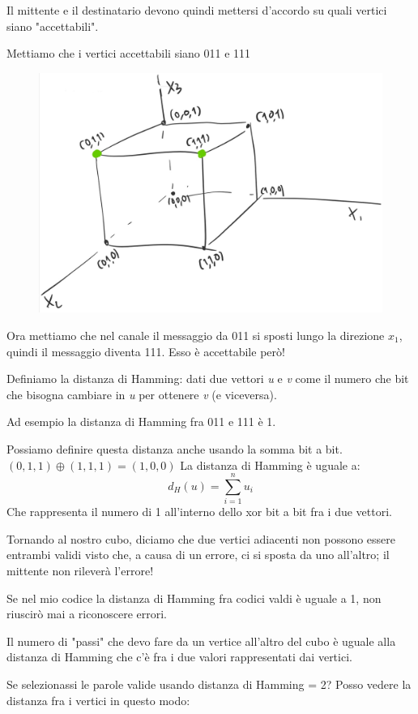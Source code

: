 Il mittente e il destinatario devono quindi mettersi d'accordo su quali vertici siano "accettabili".

Mettiamo che i vertici accettabili siano 011 e 111

\begin{figure}[H]
	\centering
	\includegraphics[width=0.7\linewidth]{immagini/img8}
\end{figure}


Ora mettiamo che nel canale il messaggio da 011 si sposti lungo la direzione $x_1$, quindi il messaggio diventa 111. Esso è accettabile però!

Definiamo la distanza di Hamming: dati due vettori \textit{u} e \textit{v} come il numero che bit che bisogna cambiare in \textit{u} per ottenere \textit{v} (e viceversa).

Ad esempio la distanza di Hamming fra 011 e 111 è 1.

Possiamo definire questa distanza anche usando la somma bit a bit.
$(0,1,1) \oplus (1,1,1) = (1,0,0)$
La distanza di Hamming è uguale a:
\begin{equation}
d_H(u)=\sum_{i=1}^{n}u_i
\end{equation}
Che rappresenta il numero di 1 all'interno dello xor bit a bit fra i due vettori.

Tornando al nostro cubo, diciamo che due vertici adiacenti non possono essere entrambi validi visto che, a causa di un errore, ci si sposta da uno all'altro; il mittente non rileverà l'errore!

Se nel mio codice la distanza di Hamming fra codici valdi è uguale a 1, non riuscirò mai a riconoscere errori.

Il numero di "passi" che devo fare da un vertice all'altro del cubo è uguale alla distanza di Hamming che c'è fra i due valori rappresentati dai vertici.

Se selezionassi le parole valide usando distanza di Hamming = 2?
Posso vedere la distanza fra i vertici in questo modo:

